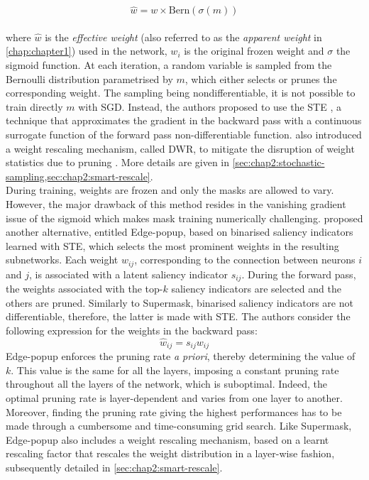 \begin{equation}
  \label{eqn:chap2:sigmoid_reparam}
  \hat{w} = w \times \text{Bern}(\sigma(m))
\end{equation}\\

\noindent where $\hat{w}$ is the \emph{effective weight} (also referred to as the
\emph{apparent weight} in \cref{chap:chapter1}) used in the network, $w_i$ is
the original frozen weight and $\sigma$ the sigmoid function. At each iteration,
a random variable is sampled from the Bernoulli distribution parametrised by
$m$, which either selects or prunes the corresponding weight. The sampling being
nondifferentiable, it is not possible to train directly $m$ with \ac{SGD}.
Instead, the authors proposed to use the \ac{STE}
\cite{DBLP:journals/corr/BengioLC13}, a technique that approximates the gradient
in the backward pass with a continuous surrogate function of the forward pass
non-differentiable function. \citeauthor{DBLP:conf/nips/ZhouLLY19} also
introduced a weight rescaling mechanism, called \ac{DWR}, to mitigate the
disruption of weight statistics due to pruning \cite{DBLP:conf/iccv/HeZRS15}.
More details are given in
\cref{sec:chap2:stochastic-sampling,sec:chap2:smart-rescale}.\\


During training, weights are frozen and only the masks are allowed to vary.
However, the major drawback of this method resides in the vanishing gradient
issue of the sigmoid which makes mask training numerically challenging.
\citeauthor{DBLP:conf/cvpr/RamanujanWKFR20}
\cite{DBLP:conf/cvpr/RamanujanWKFR20} proposed another alternative, entitled
Edge-popup, based on binarised saliency indicators learned with \ac{STE}, which
selects the most prominent weights in the resulting subnetworks. Each weight
$w_{ij}$, corresponding to the connection between neurons $i$ and $j$, is
associated with a latent saliency indicator $s_{ij}$. During the forward pass,
the weights associated with the top-$k$ saliency indicators are selected and the
others are pruned. Similarly to Supermask, binarised saliency indicators are not
differentiable, therefore, the latter is made with \ac{STE}. The authors
consider the following expression for the weights in the backward pass:
\begin{equation}
  \hat{w}_{ij} = s_{ij} w_{ij}
\end{equation}
Edge-popup enforces the pruning rate \textit{a priori}, thereby determining the
value of $k$. This value is the same for all the layers, imposing a constant
pruning rate throughout all the layers of the network, which is suboptimal.
Indeed, the optimal pruning rate is layer-dependent and varies from one layer to
another. Moreover, finding the pruning rate giving the highest performances has
to be made through a cumbersome and time-consuming grid search. Like Supermask,
Edge-popup also includes a weight rescaling mechanism, based on a learnt
rescaling factor that rescales the weight distribution in a layer-wise fashion,
subsequently detailed in \cref{sec:chap2:smart-rescale}.\\

